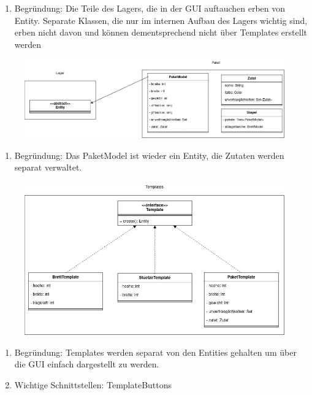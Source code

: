 \begin{enumerate}
    \item Begründung: Die Teile des Lagers, die in der GUI auftauchen erben von Entity. Separate Klassen, die nur im internen Aufbau des Lagers wichtig sind, erben nicht davon und können dementsprechend nicht über Templates erstellt werden
\end{enumerate}
\begin{figure}[H]
    \includegraphics[width=\linewidth]{images/bausteinsicht/Ebene4_Paket.png}
    \label{fig:Paket}
\end{figure}
\begin{enumerate}
    \item Begründung: Das PaketModel ist wieder ein Entity, die Zutaten werden separat verwaltet.
\end{enumerate}
\begin{figure}[H]
    \includegraphics[width=\linewidth]{images/bausteinsicht/Ebene4_Template.png}
    \label{fig:Template}
\end{figure}
\begin{enumerate}
    \item Begründung: Templates werden separat von den Entities gehalten um über die GUI einfach dargestellt zu werden.
    \item Wichtige Schnittstellen: TemplateButtons
\end{enumerate}